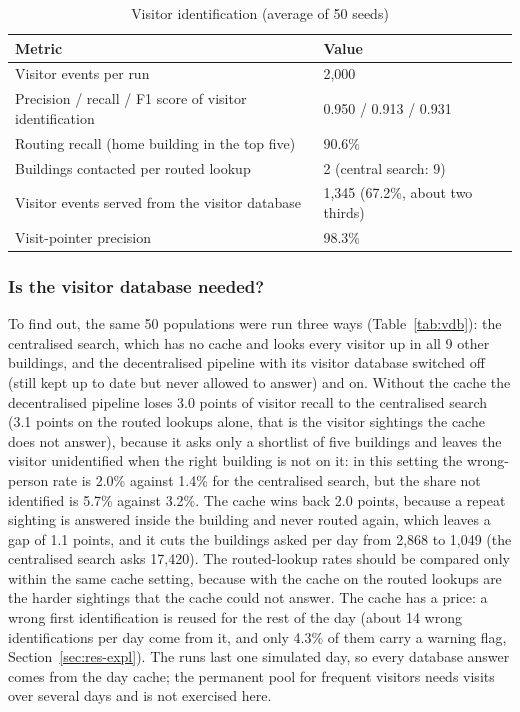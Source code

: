 \documentclass[12pt,a4paper,oneside]{report}
\begin{document}
\begin{table}[htbp]
\centering
\caption{Visitor identification (average of 50 seeds)}\label{tab:visitors}
{\small\setlength{\tabcolsep}{4pt}\renewcommand{\arraystretch}{1.2}
\begin{tabular}{|p{8.4cm}|p{3.0cm}|}\hline
\textbf{Metric} & \textbf{Value}\\\hline
Visitor events per run & 2,000\\\hline
Precision / recall / F1 score of visitor identification & 0.950 / 0.913 / 0.931\\\hline
Routing recall (home building in the top five) & 90.6\%\\\hline
Buildings contacted per routed lookup & 2 (central search: 9)\\\hline
Visitor events served from the visitor database & 1,345 (67.2\%, about two thirds)\\\hline
Visit-pointer precision & 98.3\%\\\hline
\end{tabular}}
\end{table}

\subsubsection{Is the visitor database needed?}
To find out, the same 50 populations were run three ways (Table~\ref{tab:vdb}): the centralised search, which has no cache and looks every visitor up in all 9 other buildings, and the decentralised pipeline with its visitor database switched off (still kept up to date but never allowed to answer) and on. Without the cache the decentralised pipeline loses 3.0 points of visitor recall to the centralised search (3.1 points on the routed lookups alone, that is the visitor sightings the cache does not answer), because it asks only a shortlist of five buildings and leaves the visitor unidentified when the right building is not on it: in this setting the wrong-person rate is 2.0\% against 1.4\% for the centralised search, but the share not identified is 5.7\% against 3.2\%. The cache wins back 2.0 points, because a repeat sighting is answered inside the building and never routed again, which leaves a gap of 1.1 points, and it cuts the buildings asked per day from 2,868 to 1,049 (the centralised search asks 17,420). The routed-lookup rates should be compared only within the same cache setting, because with the cache on the routed lookups are the harder sightings that the cache could not answer. The cache has a price: a wrong first identification is reused for the rest of the day (about 14 wrong identifications per day come from it, and only 4.3\% of them carry a warning flag, Section~\ref{sec:res-expl}). The runs last one simulated day, so every database answer comes from the day cache; the permanent pool for frequent visitors needs visits over several days and is not exercised here.
\end{document}
